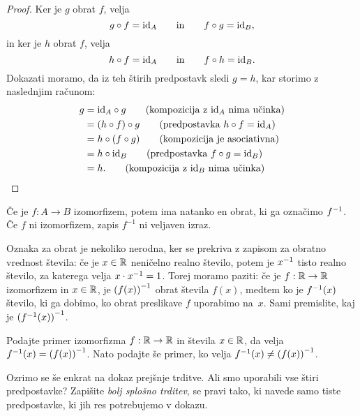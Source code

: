 \begin{proof}
  Ker je $g$ obrat $f$, velja
  \begin{equation*}
    g \circ f = \id[A]
    \qquad\text{in}\qquad
    f \circ g = \id[B],
  \end{equation*}
  in ker je $h$ obrat $f$, velja
  \begin{equation*}
    h \circ f = \id[A]
    \qquad\text{in}\qquad
    f \circ h = \id[B].
  \end{equation*}
  Dokazati moramo, da iz teh štirih predpostavk sledi $g = h$, kar storimo z naslednjim
  računom:
  \begin{align*}
    g
    &= \id[A] \circ g \tag{kompozicija z $\id[A]$ nima učinka} \\
    &= (h \circ f) \circ g \tag{predpostavka $h \circ f = \id[A]$} \\
    &= h \circ (f \circ g) \tag{kompozicija je asociativna} \\
    &= h \circ \id[B] \tag{predpostavka $f \circ g = \id[B]$} \\
    &= h. \tag{kompozicija z $\id[B]$ nima učinka}
  \end{align*}
\end{proof}

Če je $f : A \to B$ izomorfizem, potem ima natanko en obrat, ki ga označimo $\inv{f}$. Če
$f$ ni izomorfizem, zapis $f^{-1}$ ni veljaven izraz.

Oznaka za obrat je nekoliko nerodna, ker se prekriva z zapisom za obratno vrednost
števila: če je $x \in \RR$ neničelno realno število, potem je $\inv{x}$ tisto realno
število, za katerega velja $x \cdot \inv{x} = 1$. Torej moramo paziti: če je
$f : \RR \to \RR$ izomorfizem in $x \in \RR$, je $\inv{(f(x))}$ obrat števila $f(x)$,
medtem ko je $\inv{f}(x)$ število, ki ga dobimo, ko obrat preslikave $f$ uporabimo na~$x$.
Sami premislite, kaj je $\inv{(\inv{f}(x))}$.

\begin{vaja}
  Podajte primer izomorfizma $f : \RR \to \RR$ in števila $x \in \RR$, da velja
  $\inv{f}(x) = \inv{(f(x))}$. Nato podajte še primer, ko velja
  $\inv{f}(x) \neq \inv{(f(x))}$.
\end{vaja}

\begin{vaja}
  Ozrimo se še enkrat na dokaz prejšnje trditve. Ali smo uporabili vse štiri predpostavke?
  Zapišite \emph{bolj splošno trditev}, se pravi tako, ki navede samo tiste predpostavke,
  ki jih res potrebujemo v dokazu.
\end{vaja}

